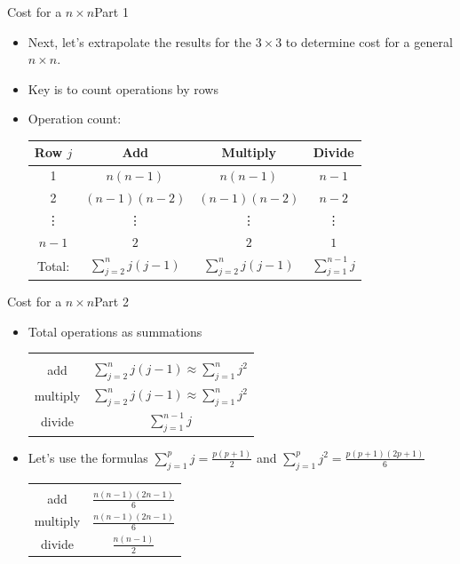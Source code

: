 \documentclass[10pt]{beamer}
\begin{document}
\begin{frame}{Cost for a $n\times n$}{Part 1}
\begin{itemize}
    \item Next, let's extrapolate the results for the $3 \times 3$ to determine cost for a general $n \times n$.\\[3mm]

    \item Key is to count operations by rows\\[3mm]


    \item Operation count:
    
\begin{center}
\begin{tabular}{c c c c}\hline
Row $j$ & Add & Multiply & Divide\\\hline
1 & $n(n-1)$ & $n(n-1)$ & $n-1$\\
2 & $(n-1)(n-2)$ & $(n-1)(n-2)$ & $n-2$\\
\vdots & \vdots &\vdots &\vdots \\
$n-1$ & $2$ & $2$ & $1$\\\hline
Total: &  $\sum_{j=2}^{n} j(j-1)$ & $\sum_{j=2}^{n} j(j-1)$ &  $\sum_{j=1}^{n-1} j$
\end{tabular}
\end{center}

\end{itemize}
\end{frame}
\begin{frame}{Cost for a $n\times n$}{Part 2}
\begin{itemize}
    \item Total operations as summations
\begin{center}
\begin{tabular}{c c}\hline\\
add & $\sum_{j=2}^{n} j(j-1) \approx \sum_{j=1}^nj^2$ \\[5pt]
multiply & $\sum_{j=2}^{n} j(j-1) \approx \sum_{j=1}^nj^2 $\\[5pt]
divide & $\sum_{j=1}^{n-1} j$ \\[7pt]
\hline
\end{tabular}
\end{center}

\vspace{5mm}

\item Let's use the formulas $\sum_{j=1}^{p} j = \frac{p(p+1)}{2}$ and
$\sum_{j=1}^{p} j^2= \frac{p(p+1)(2p+1)}{6}$
\begin{center}
\begin{tabular}{c c}\hline\\
add & $\frac{n(n-1)(2n-1)}{6}$ \\[8pt]
multiply & $\frac{n(n-1)(2n-1)}{6}$\\[8pt]
divide & $\frac{n(n-1)}{2}$ \\[7pt] 
\hline
\end{tabular}
\end{center}
\end{itemize}
\end{frame}
\end{document}
